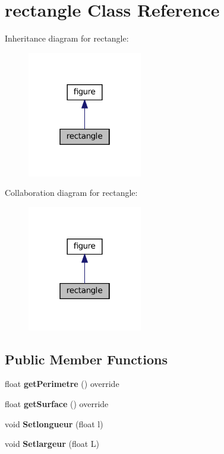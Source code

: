 \hypertarget{classrectangle}{}\section{rectangle Class Reference}
\label{classrectangle}


Inheritance diagram for rectangle\+:
\nopagebreak
\begin{figure}[H]
\begin{center}
\leavevmode
\includegraphics[width=142pt]{classrectangle__inherit__graph}
\end{center}
\end{figure}


Collaboration diagram for rectangle\+:
\nopagebreak
\begin{figure}[H]
\begin{center}
\leavevmode
\includegraphics[width=142pt]{classrectangle__coll__graph}
\end{center}
\end{figure}
\subsection*{Public Member Functions}
\begin{DoxyCompactItemize}
\item 
\mbox{\label{classrectangle_a7b8105e029fcfbd0bf8a99f91df2a4ed}} 
float {\bfseries get\+Perimetre} () override
\item 
\mbox{\label{classrectangle_ae08cdfb566b44227e2aaf4e08671d60e}} 
float {\bfseries get\+Surface} () override
\item 
\mbox{\label{classrectangle_abdf1a061e88226c424173a2022234d9b}} 
void {\bfseries Setlongueur} (float l)
\item 
\mbox{\label{classrectangle_a179b4c863a4a47cbb4e5607124947124}} 
void {\bfseries Setlargeur} (float L)
\end{DoxyCompactItemize}
